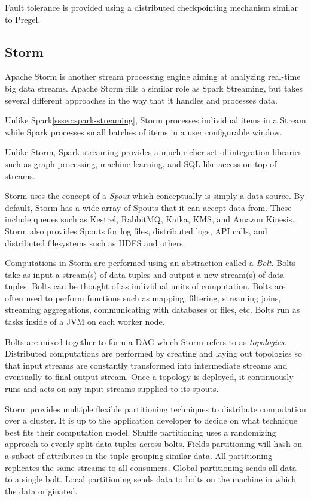 \documentclass[]{article}
\begin{document}
Fault tolerance is provided using a distributed checkpointing mechanism similar to Pregel.

\subsection{Storm}\label{ssec:storm}
Apache Storm\cite{storm}\cite{ballou2014}\cite{scott2016} is another stream processing engine aiming at analyzing real-time big data streams. Apache Storm fills a similar role as Spark Streaming, but takes several different approaches in the way that it handles and processes data.

Unlike Spark\ref{sssec:spark-streaming}, Storm processes individual items in a Stream while Spark processes small batches of items in a user configurable window.

Unlike Storm, Spark streaming provides a much richer set of integration libraries such as graph processing, machine learning, and SQL like access on top of streams. 

Storm uses the concept of a \textit{Spout} which conceptually is simply a data source. By default, Storm has a wide array of Spouts that it can accept data from. These include queues such as Kestrel, RabbitMQ, Kafka, KMS, and Amazon Kinesis. Storm also provides Spouts for log files, distributed logs, API calls, and distributed filesystems such as HDFS and others.

Computations in Storm are performed using an abstraction called a \textit{Bolt}. Bolts take as input a stream(s) of data tuples and output a new stream(s) of data tuples. Bolts can be thought of as individual units of computation. Bolts are often used to perform functions such as mapping, filtering, streaming joins, streaming aggregations, communicating with databases or files, etc. Bolts run as tasks inside of a JVM on each worker node. 

Bolts are mixed together to form a DAG which Storm refers to as \textit{topologies}. Distributed computations are performed by creating and laying out topologies so that input streams are constantly transformed into intermediate streams and eventually to final output stream. Once a topology is deployed, it continuously runs and acts on any input streams supplied to its spouts.

Storm provides multiple flexible partitioning techniques to distribute computation over a cluster. It is up to the application developer to decide on what technique best fits their computation model. Shuffle partitioning uses a randomizing approach to evenly split data tuples across bolts. Fields partitioning will hash on a subset of attributes in the tuple grouping similar data. All partitioning replicates the same streams to all consumers. Global partitioning sends all data to a single bolt. Local partitioning sends data to bolts on the machine in which the data originated\cite{toshniwal2014storm}. 
\end{document}
